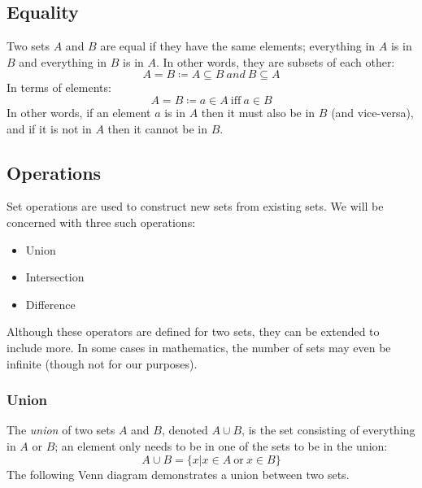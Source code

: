 \documentclass[letterpaper,12pt,fleqn]{article}
\begin{document}
\subsection*{Equality}

Two sets $A$ and $B$ are equal if they have the same elements; everything in
$A$ is in $B$ and everything in $B$ is in $A$. In other words, they are
subsets of each other:
\[A=B\coloneqq A\subseteq B\ and\ B\subseteq A\]
In terms of elements:
\[A=B\coloneqq a\in A\ \mbox{iff}\ a\in B\]
In other words, if an element $a$ is in $A$ then it must also be in $B$ (and
vice-versa), and if it is not in $A$ then it cannot be in $B$.

\subsection*{Operations}

Set operations are used to construct new sets from existing sets. We will be
concerned with three such operations:
\begin{itemize}
\item Union
\item Intersection
\item Difference
\end{itemize}
Although these operators are defined for two sets, they can be extended to
include more. In some cases in mathematics, the number of sets may even be
infinite (though not for our purposes).

\subsubsection*{Union}

The \emph{union} of two sets $A$ and $B$, denoted $A\cup B$, is the set
consisting of everything in $A$ or $B$; an element only needs to be in one
of the sets to be in the union:
\[A\cup B=\{x|x\in A\ \mbox{or}\ x\in B\}\]
The following Venn diagram demonstrates a union between two sets.

\begin{center}
\end{center}
\end{document}
